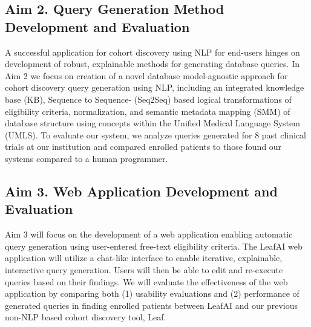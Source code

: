 \documentclass[../main.tex]{subfiles}
\begin{document}
\subsection{Aim 2. Query Generation Method Development and Evaluation}
A successful application for cohort discovery using NLP for end-users hinges on development of robust, explainable methods for generating database queries. In Aim 2 we focus on creation of a novel database model-agnostic approach for cohort discovery query generation using NLP, including an integrated knowledge base (KB), Sequence to Sequence- (Seq2Seq) based logical transformations of eligibility criteria, normalization, and semantic metadata mapping (SMM) of database structure using concepts within the Unified Medical Language System (UMLS). To evaluate our system, we analyze queries generated for 8 past clinical trials at our institution and compared enrolled patients to those found our systems compared to a human programmer.

\subsection{Aim 3. Web Application Development and Evaluation}
Aim 3 will focus on the development of a web application enabling automatic query generation using user-entered free-text eligibility criteria. The LeafAI web application will utilize a chat-like interface to enable iterative, explainable, interactive query generation. Users will then be able to edit and re-execute queries based on their findings. We will evaluate the effectiveness of the web application by comparing both (1) usability evaluations and (2) performance of generated queries in finding enrolled patients between LeafAI and our previous non-NLP based cohort discovery tool, Leaf.

\newpage
\end{document}
